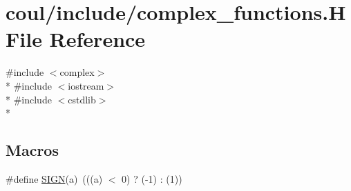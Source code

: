 \hypertarget{complex__functions_8H}{\section{coul/include/complex\-\_\-functions.H File Reference}
\label{complex__functions_8H}
}
{\ttfamily \#include $<$complex$>$}\\*
{\ttfamily \#include $<$iostream$>$}\\*
{\ttfamily \#include $<$cstdlib$>$}\\*
\subsection*{Macros}
\begin{DoxyCompactItemize}
\item 
\#define \hyperlink{complex__functions_8H_a8c4a9e5e4622948245de4ec0b5d38329}{S\-I\-G\-N}(a)~(((a) $<$ 0) ? (-\/1) \-: (1))
\end{DoxyCompactItemize}
